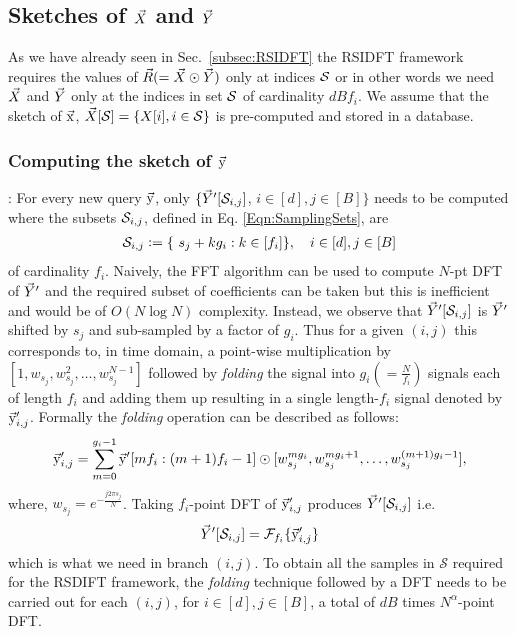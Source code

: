 \subsection{Sketches of $\vec{X}$ and $\vec{Y}$}
\label{subsec:skteches}		
 As we have already seen in Sec.~\ref{subsec:RSIDFT} the RSIDFT framework requires the values of $\vec{R}(=\vec{X}\odot \vec{Y})$ only at indices $\mathcal{S}$ or in other words we need $\vec{X}$ and $\vec{Y}$ only at the indices in set $\mathcal{S}$ of cardinality $dBf_i$. We assume that the sketch of $\vec{\mathrm{x}}$, $ \vec{X}[\mathcal{S}]= \{X[i],i\in \mathcal{S}\}$ is pre-computed and stored in a database.

\subsubsection*{Computing the sketch of $\vec{\mathrm{y}}$}: For every new query $\vec{\mathrm{y}}$, only $\{\vec{Y}'[\mathcal{S}_{i,j}]$,  $i\in[d],j\in[B]\}$ needs to be computed where the subsets $\mathcal{S}_{i,j}$, defined in Eq. \eqref{Eqn:SamplingSets}, are
\begin{align}
	 \mathcal{S}_{i,j} \mathrel{\mathop:}= \{\ s_j + k g_i: k\in[f_i]\}, \quad i\in[d], j\in[B]
\end{align}
of cardinality $f_i$. Naively, the FFT algorithm can be used to compute $N$-pt DFT of $\vec{Y}'$ and the required subset of coefficients can be taken but this is inefficient and would be of $O(N \log N)$ complexity. Instead, we observe that $\vec{Y}'[\mathcal{S}_{i,j}]$ is $\vec{Y}'$ shifted by $s_j$ and sub-sampled by a factor of $g_i$. Thus for a given $(i,j)$ this corresponds to, in time domain, a point-wise multiplication by $[1,w_{s_j},w_{s_j}^2,\ldots,w_{s_j}^{N-1}]$ followed by \textit{folding} the signal into $g_i(=\frac{N}{f_i})$ signals each of length $f_i$ and adding them up resulting in a single length-$f_i$ signal denoted by $\vec{\mathrm{y}}'_{i,j}$. Formally the \textit{folding} operation can be described as follows:
\begin{equation}
	\vec{\mathrm{y}}'_{i,j} = \sum \limits_{m = 0}^{g_i-1} \vec{\mathrm{y}}'[mf_i:(m+1)f_i-1] \odot [w_{s_j}^{mg_i},w_{s_j}^{mg_i+1},\ldots, w_{s_j}^{(m+1)g_i-1}],
\end{equation}	
where, $w_{s_j}=e^{-\frac{j2\pi s_j}{N}}$. Taking $f_i$-point DFT of $\vec{\mathrm{y}}'_{i,j}$ produces $\vec{Y}'[\mathcal{S}_{i,j}]$ i.e. 
 \begin{align*}
	\vec{Y}'[\mathcal{S}_{i,j}]=\mathcal{F}_{f_i} \{\vec{\mathrm{y}}'_{i,j}\}
\end{align*}
which is what we need in branch $(i,j)$. To obtain all the samples in $\mathcal{S}$ required for the RSDIFT framework, the \textit{folding} technique followed by a DFT needs to be carried out for each $(i,j)$, for $i\in[d],j\in[B]$, a total of $dB$ times $N^{\alpha}$-point DFT.


